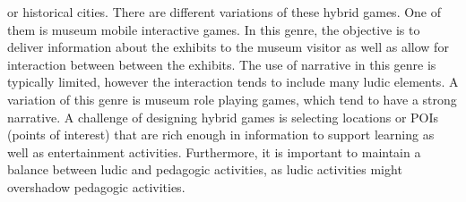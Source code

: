or historical cities. There are different variations of
these hybrid games. One of them is museum mobile interactive
games. In this genre, the objective is to deliver information
about the exhibits to the museum visitor as well as
allow for interaction between between the exhibits. The use
of narrative in this genre is typically limited, however the interaction
tends to include many ludic elements. A variation of
this genre is museum role playing games, which tend to have
a strong narrative. A challenge of designing hybrid games is
selecting locations or POIs (points of interest) that are rich
enough in information to support learning as well as entertainment
activities. Furthermore, it is important to maintain a balance between ludic and pedagogic activities, as ludic activities
might overshadow pedagogic activities.